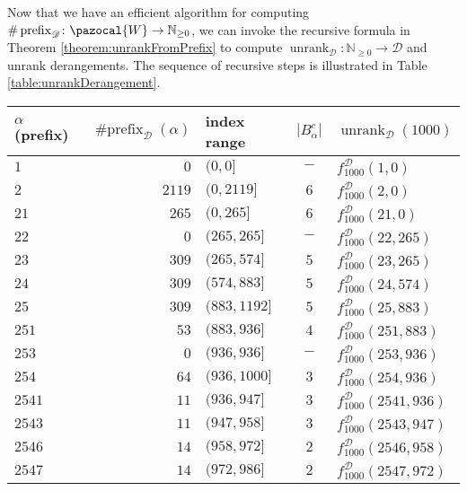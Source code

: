 Now that we have an efficient algorithm for computing
$\#\operatorname{prefix}_\mathcal{D} \colon \pazocal{W} \rightarrow \mathbb{N}_{\geq 0}$,
we can invoke the recursive formula in Theorem \ref{theorem:unrankFromPrefix} to
compute
$\operatorname{unrank}_\mathcal{D} \colon \mathbb{N}_{\geq 0} \rightarrow \mathcal{D}$
and unrank derangements.
The sequence of recursive steps is illustrated in
Table \ref{table:unrankDerangement}.
\begin{table}
\center
\begin{tabular}{|l|r|l|c|l|}
  \hline
  $\alpha$ (prefix)
    & $\operatorname{\#prefix}_\mathcal{D}(\alpha)$
    & index range
    & $|B_\alpha^c|$
    & $\operatorname{unrank}_\mathcal{D}(1000)$
  \\ \hline
  $1       $ & $0$    & $(0,0]$           & $-$ & $f^{\mathcal{D}}_{1000}(1, 0)$          \\
  $2       $ & $2119$ & $(0,2119]$        & $6$ & $f^{\mathcal{D}}_{1000}(2, 0)$          \\
  \hline
  $21      $ & $265$  & $(0, 265]$        & $6$ & $f^{\mathcal{D}}_{1000}(21, 0)$         \\
  $22      $ & $0$    & $(265, 265]$      & $-$ & $f^{\mathcal{D}}_{1000}(22, 265)$       \\
  $23      $ & $309$  & $(265, 574]$      & $5$ & $f^{\mathcal{D}}_{1000}(23, 265)$       \\
  $24      $ & $309$  & $(574, 883]$      & $5$ & $f^{\mathcal{D}}_{1000}(24, 574)$       \\
  $25      $ & $309$  & $(883, 1192]$     & $5$ & $f^{\mathcal{D}}_{1000}(25, 883)$       \\
  \hline
  $251     $ & $53$   & $(883, 936]$      & $4$ & $f^{\mathcal{D}}_{1000}(251, 883)$      \\
  $253     $ & $0$    & $(936, 936]$      & $-$ & $f^{\mathcal{D}}_{1000}(253, 936)$      \\
  $254     $ & $64$   & $(936, 1000]$     & $3$ & $f^{\mathcal{D}}_{1000}(254, 936)$      \\
  \hline
  $2541    $ & $11$   & $(936, 947]$      & $3$ & $f^{\mathcal{D}}_{1000}(2541, 936)$     \\
  $2543    $ & $11$   & $(947, 958]$      & $3$ & $f^{\mathcal{D}}_{1000}(2543, 947)$     \\
  $2546    $ & $14$   & $(958, 972]$      & $2$ & $f^{\mathcal{D}}_{1000}(2546, 958)$     \\
  $2547    $ & $14$   & $(972, 986]$      & $2$ & $f^{\mathcal{D}}_{1000}(2547, 972)$     \\

\end{tabular}
\end{table}

